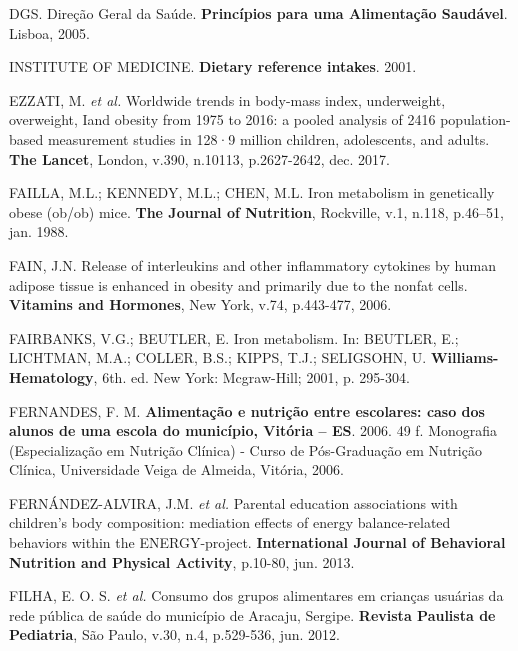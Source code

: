 \noindent DGS. Direção Geral da Saúde. \textbf{Princípios para uma Alimentação Saudável}. Lisboa, 2005.

\bigbreak

\noindent INSTITUTE OF MEDICINE. \textbf{Dietary reference intakes}. 2001.

\bigbreak

\noindent EZZATI, M. \textit{et al.} Worldwide trends in body-mass index, underweight, overweight, Iand obesity from 1975 to 2016: a pooled analysis of 2416 population-based measurement studies in 128·9 million children, adolescents, and adults. \textbf{The Lancet}, London, v.390, n.10113, p.2627-2642, dec. 2017. 

\bigbreak

\noindent FAILLA, M.L.; KENNEDY, M.L.; CHEN, M.L. Iron metabolism in genetically obese (ob/ob) mice. \textbf{The Journal of Nutrition}, Rockville, v.1, n.118, p.46–51, jan. 1988. 

\bigbreak

\noindent FAIN, J.N. Release of interleukins and other inflammatory cytokines by human adipose tissue is enhanced in obesity and primarily due to the nonfat cells. \textbf{Vitamins and Hormones}, New York, v.74, p.443-477, 2006.

\bigbreak

\noindent FAIRBANKS, V.G.; BEUTLER, E. Iron metabolism. In: BEUTLER, E.; LICHTMAN, M.A.; COLLER, B.S.; KIPPS, T.J.; SELIGSOHN, U. \textbf{Williams-Hematology}, 6th. ed. New York: Mcgraw-Hill; 2001, p. 295-304.  

\bigbreak

\noindent FERNANDES, F. M. \textbf{Alimentação e nutrição entre escolares: caso dos alunos de uma escola do município, Vitória – ES}. 2006. 49 f. Monografia (Especialização em Nutrição Clínica) - Curso de Pós-Graduação em Nutrição Clínica, Universidade Veiga de Almeida, Vitória, 2006.

\bigbreak

\noindent FERNÁNDEZ-ALVIRA, J.M. \textit{et al.} Parental education associations with children’s body composition: mediation effects of energy balance-related behaviors within the ENERGY-project. \textbf{International Journal of Behavioral Nutrition and Physical Activity}, p.10-80, jun. 2013. 

\bigbreak

\noindent FILHA, E. O. S. \textit{et al.} Consumo dos grupos alimentares em crianças usuárias da rede pública de saúde do município de Aracaju, Sergipe. \textbf{Revista Paulista de Pediatria}, São Paulo, v.30, n.4, p.529-536, jun. 2012.

